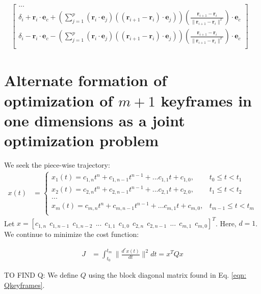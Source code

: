 \documentclass[11pt]{article}
\begin{document}
\begin{align*}
\begin{bmatrix}
... \\
\delta_i + \mathbf{r}_i \cdot \mathbf{e}_c +  \left( \sum_{j = 1}^{p}  {(\mathbf{r}_i \cdot \mathbf{e}_j)(( \mathbf{r}_{i+1} - \mathbf{r}_i ) \cdot \mathbf{e}_j)} \right) (\frac{ \mathbf{r}_{i+1} - \mathbf{r}_i } { \| \mathbf{r}_{i+1} - \mathbf{r}_i \|^2 }) \cdot \mathbf{e}_c \\
\delta_i - \mathbf{r}_i \cdot \mathbf{e}_c -  \left( \sum_{j = 1}^{p}  {(\mathbf{r}_i \cdot \mathbf{e}_j)(( \mathbf{r}_{i+1} - \mathbf{r}_i ) \cdot \mathbf{e}_j)} \right) (\frac{ \mathbf{r}_{i+1} - \mathbf{r}_i } { \| \mathbf{r}_{i+1} - \mathbf{r}_i \|^2 }) \cdot \mathbf{e}_c  \\
\end{bmatrix} &
\end{align*}






\newpage
\section{Alternate formation of optimization of $m+1$ keyframes in one dimensions as a joint optimization problem}

\mbox{} \newline
We seek the piece-wise trajectory: 
\begin{align*}
x(t) &= 
\begin{cases}
    x_1 (t) = c_{1, n} t^n + c_{1, n-1} t^{n-1} + ... c_{1, 1} t + c_{1, 0}, & t_0 \le t < t_1 \\
    x_2 (t) = c_{2, n} t^n + c_{2, n-1} t^{n-1} + ... c_{2, 1} t + c_{2, 0}, & t_1 \le t < t_2 \\
    ... \\
    x_m (t) = c_{m, n} t^n + c_{m, n-1} t^{n-1} + ... c_{m, 1} t + c_{m, 0}, & t_{m-1} \le t < t_m \\
\end{cases}
\end{align*} 
Let $x = [c_{1, n} \ \ c_{1, n-1} \ \ c_{1, n-2} \ \ ... \ \ c_{1, 1} \ \ c_{1, 0} \ \ c_{2, n} \ \ c_{2, n-1} \ \ ... \ \ c_{m, 1} \ \ c_{m, 0} ]^T$. Here, $d = 1$. We continue to minimize the cost function:

\begin{align*}
J &= \int_{t_0}^{t_m} \|  \frac{d^{r} x(t) }{dt} \|^2 dt = x^T Q x
\end{align*}



\mbox{} \newline
\mbox{} \newline
TO FIND Q: \newline
We define $Q$ using the block diagonal matrix found in Eq. \ref{eqn: Qkeyframes}. 
\end{document}
